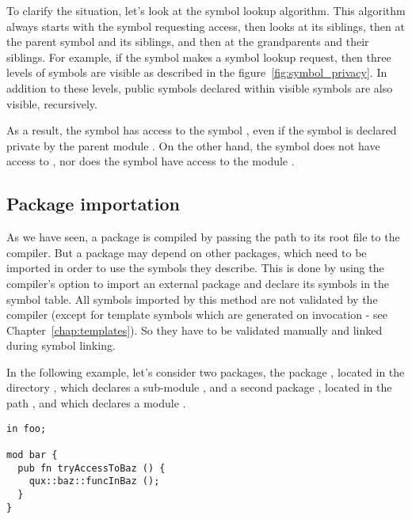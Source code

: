 To clarify the situation, let's look at the symbol lookup algorithm. This
algorithm always starts with the symbol requesting access, then looks at its
siblings, then at the parent symbol and its siblings, and then at the
grandparents and their siblings. For example, if the symbol
 makes a symbol lookup request, then three levels
of symbols are visible as described in the figure~\ref{fig:symbol_privacy}. In
addition to these levels, public symbols declared within visible symbols are
also visible, recursively.



As a result, the symbol  has access to the symbol
, even if the symbol  is declared
private by the parent module . On the other hand, the symbol
 does not have access to
, nor does the symbol  have access to
the module .

\subsection{Package importation}

As we have seen, a package is compiled by passing the path to its root file to
the compiler. But a package may depend on other packages, which need to be
imported in order to use the symbols they describe. This is done by using the
compiler's  option to import an external package and declare its
symbols in the symbol table. All symbols imported by this method are not
validated by the compiler (except for template symbols which are generated on
invocation - see Chapter~\ref{chap:templates}). So they have to be validated
manually and linked during symbol linking.

In the following example, let's consider two packages, the package ,
located in the directory , which declares a
sub-module , and a second package , located in the path
, and which declares a module .

\begin{lstlisting}[caption=\textit{/home/alice/mypackage/foo.yr}, style=coloredverbatim]
in foo;

mod bar {
  pub fn tryAccessToBaz () {
    qux::baz::funcInBaz ();
  }
}
\end{lstlisting}

